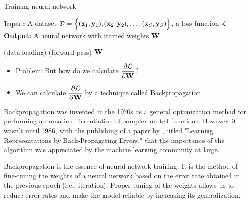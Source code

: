 \documentclass[14pt, a4paper]{article}
\numberwithin{equation}{section}
\numberwithin{algorithm}{section}
\numberwithin{figure}{section}
\begin{document}
\begin{algorithm}[h!]
  \caption{Training neural network}
  \hspace*{\algorithmicindent} \textbf{Input:} {A dataset $\mathcal{D}=\Big\lbrace (\bold{x}_1, \bold{y}_1), (\bold{x}_2, \bold{y}_2), \dots, (\bold{x}_S, \bold{y}_S) \Big\rbrace$, a loss function $\mathcal{L}$} \\
  \hspace*{\algorithmicindent} \textbf{Output:} {A neural network with trained weights $\bold{W}$}
  \begin{algorithmic}[1]
       (data loading)
       (forward pass)
    \EndWhile
    \State \Return $\bold{W}$
  \end{algorithmic}
\end{algorithm}

\begin{itemize}
  \item Problem: But how do we calculate $\dfrac{\partial \mathcal{L}}{\partial \bold{W}}$?
  \item We can calculate $\dfrac{\partial \mathcal{L}}{\partial \bold{W}}$ by a technique called Backpropagation
\end{itemize}

Backpropagation was invented in the 1970s as a general optimization method for performing automatic differentiation of complex nested functions. 
However, it wasn't until 1986, with the publishing of a paper by \cite{rumelhart1986learning}, titled "Learning Representations by Back-Propagating Errors," that the importance of the algorithm was appreciated by the machine learning community at large.

Backpropagation is the essence of neural network training. 
It is the method of fine-tuning the weights of a neural network based on the error rate obtained in the previous epoch (i.e., iteration). 
Proper tuning of the weights allows us to reduce error rates and make the model reliable by increasing its generalization.
\end{document}
